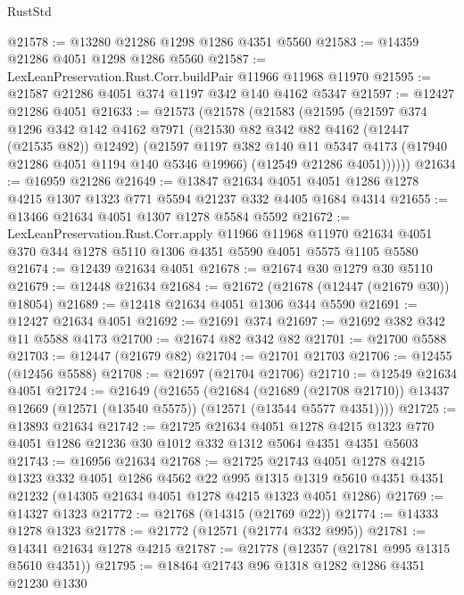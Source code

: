 \begin{lexlean}{RustStd}
\begin{coremodule}
@21578 := @13280 @21286 @1298 @1286 @4351 @5560
@21583 := @14359 @21286 @4051 @1298 @1286 @5560
@21587 := LexLeanPreservation.Rust.Corr.buildPair @11966 @11968 @11970
@21595 := @21587 @21286 @4051 @374 @1197 @342 @140 @4162 @5347
@21597 := @12427 @21286 @4051
@21633 := @21573
    (@21578
      (@21583
        (@21595
          (@21597
            @374
            @1296
            @342
            @142
            @4162
            @7971
            (@21530 @82 @342 @82 @4162 (@12447 (@21535 @82)) @12492)
            (@21597
              @1197
              @382
              @140
              @11
              @5347
              @4173
              (@17940 @21286 @4051 @1194 @140 @5346 @19966)
              (@12549 @21286 @4051))))))
@21634 := @16959 @21286
@21649 := @13847
    @21634
    @4051
    @4051
    @1286
    @1278
    @4215
    @1307
    @1323
    @771
    @5594
    @21237
    @332
    @4405
    @1684
    @4314
@21655 := @13466 @21634 @4051 @1307 @1278 @5584 @5592
@21672 := LexLeanPreservation.Rust.Corr.apply
    @11966
    @11968
    @11970
    @21634
    @4051
    @370
    @344
    @1278
    @5110
    @1306
    @4351
    @5590
    @4051
    @5575
    @1105
    @5580
@21674 := @12439 @21634 @4051
@21678 := @21674 @30 @1279 @30 @5110
@21679 := @12448 @21634
@21684 := @21672 (@21678 (@12447 (@21679 @30)) @18054)
@21689 := @12418 @21634 @4051 @1306 @344 @5590
@21691 := @12427 @21634 @4051
@21692 := @21691 @374
@21697 := @21692 @382 @342 @11 @5588 @4173
@21700 := @21674 @82 @342 @82
@21701 := @21700 @5588
@21703 := @12447 (@21679 @82)
@21704 := @21701 @21703
@21706 := @12455 (@12456 @5588)
@21708 := @21697 (@21704 @21706)
@21710 := @12549 @21634 @4051
@21724 := @21649
    (@21655
      (@21684
        (@21689 (@21708 @21710))
        @13437
        @12669
        (@12571 (@13540 @5575))
        (@12571 (@13544 @5577 @4351))))
@21725 := @13893 @21634
@21742 := @21725
    @21634
    @4051
    @1278
    @4215
    @1323
    @770
    @4051
    @1286
    @21236
    @30
    @1012
    @332
    @1312
    @5064
    @4351
    @4351
    @5603
@21743 := @16956 @21634
@21768 := @21725
    @21743
    @4051
    @1278
    @4215
    @1323
    @332
    @4051
    @1286
    @4562
    @22
    @995
    @1315
    @1319
    @5610
    @4351
    @4351
    @21232
    (@14305 @21634 @4051 @1278 @4215 @1323 @4051 @1286)
@21769 := @14327 @1323
@21772 := @21768 (@14315 (@21769 @22))
@21774 := @14333 @1278 @1323
@21778 := @21772 (@12571 (@21774 @332 @995))
@21781 := @14341 @21634 @1278 @4215
@21787 := @21778 (@12357 (@21781 @995 @1315 @5610 @4351))
@21795 := @18464 @21743 @96 @1318 @1282 @1286 @4351 @21230 @1330

\end{coremodule}
\end{lexlean}
